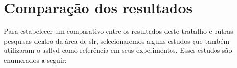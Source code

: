 \section{Comparação dos resultados}
\label{sec:comparacao-resultados}

Para estabelecer um comparativo entre os resultados deste trabalho e outras pesquisas dentro da área de \acrfull{slr}, selecionaremos alguns estudos que também utilizaram o \acrshort{asllvd} como referência em seus experimentos.
Esses estudos são enumerados a seguir:



